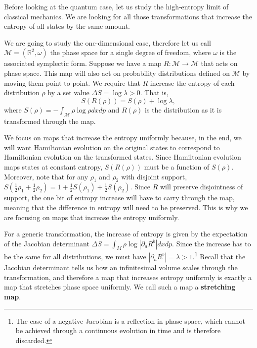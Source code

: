 \documentclass{SciPost}
\begin{document}
Before looking at the quantum case, let us study the high-entropy limit of classical mechanics. We are looking for all those transformations that increase the entropy of all states by the same amount.

We are going to study the one-dimensional case, therefore let us call $\mathcal{M} = (\mathbb{R}^2, \omega)$ the phase space for a single degree of freedom, where $\omega$ is the associated symplectic form. Suppose we have a map $R : \mathcal{M} \to \mathcal{M}$ that acts on phase space. This map will also act on probability distributions defined on $\mathcal{M}$ by moving them point to point. We require that $R$ increase the entropy of each distribution $\rho$ by a set value $\Delta S = \log \lambda > 0$. That is,
\begin{equation}
	S(R(\rho)) = S(\rho) + \log \lambda,
\end{equation}
where $S(\rho) = - \int_{\mathcal{M}} \rho \log \rho dx dp$ and $R(\rho)$ is the distribution as it is transformed through the map.

We focus on maps that increase the entropy uniformly because, in the end, we will want Hamiltonian evolution on the original states to correspond to Hamiltonian evolution on the transformed states. Since Hamiltonian evolution maps states at constant entropy, $S(R(\rho))$ must be a function of $S(\rho)$. Moreover, note that for any $\rho_1$ and $\rho_2$ with disjoint support, $S\left(\frac{1}{2}\rho_1 + \frac{1}{2}\rho_2\right) = 1 + \frac{1}{2}S\left(\rho_1\right) + \frac{1}{2}S\left(\rho_2\right)$. Since $R$ will preserve disjointness of support, the one bit of entropy increase will have to carry through the map, meaning that the difference in entropy will need to be preserved. This is why we are focusing on maps that increase the entropy uniformly.

For a generic transformation, the increase of entropy is given by the expectation of the Jacobian determinant $\Delta S =\int_M \rho \log |\partial_a R^b| dxdp$. Since the increase has to be the same for all distributions, we must have $|\partial_a R^b| = \lambda > 1$.\footnote{The case of a negative Jacobian is a reflection in phase space, which cannot be achieved through a continuous evolution in time and is therefore discarded.} Recall that the Jacobian determinant tells us how an infinitesimal volume scales through the transformation, and therefore a map that increases entropy uniformly is exactly a map that stretches phase space uniformly. We call such a map a \textbf{stretching map}.
\end{document}
